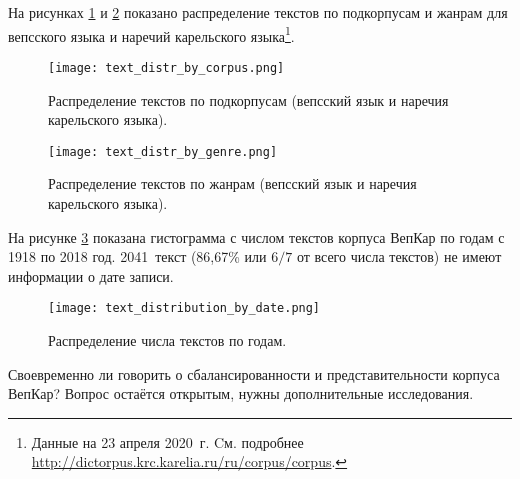 На рисунках \ref{fig:text_distr_by_corpus} и \ref{fig:text_distr_by_genre} показано распределение текстов по подкорпусам и жанрам для вепсского языка и наречий карельского языка\footnote{ Данные на 23 апреля 2020~г. Cм. подробнее 
			\href{http://dictorpus.krc.karelia.ru/ru/corpus/corpus}{http://dictorpus.krc.karelia.ru/ru/corpus/corpus}.}.

\begin{figure}
    \centering
    \texttt{[image: text\_distr\_by\_corpus.png]}
    \caption{Распределение текстов по подкорпусам (вепсский язык и наречия карельского языка).}
    \label{fig:text_distr_by_corpus}
\end{figure}

\begin{figure}
    \centering
    \texttt{[image: text\_distr\_by\_genre.png]}
    \caption{Распределение текстов по жанрам (вепсский язык и наречия карельского языка).}
    \label{fig:text_distr_by_genre}
\end{figure}

На рисунке \ref{fig:text_distribution_by_date} показана гистограмма 
с числом текстов корпуса ВепКар по годам с 1918 по 2018 год. 
2041~текст (86,67\% или $6/7$ от всего числа текстов) не имеют информации о дате записи.
\begin{figure}
    \centering
    \texttt{[image: text\_distribution\_by\_date.png]}
    \caption{Распределение числа текстов по годам.}
    \label{fig:text_distribution_by_date}
\end{figure}

Своевременно ли говорить о сбалансированности и представительности корпуса ВепКар? Вопрос остаётся открытым, нужны дополнительные исследования.


